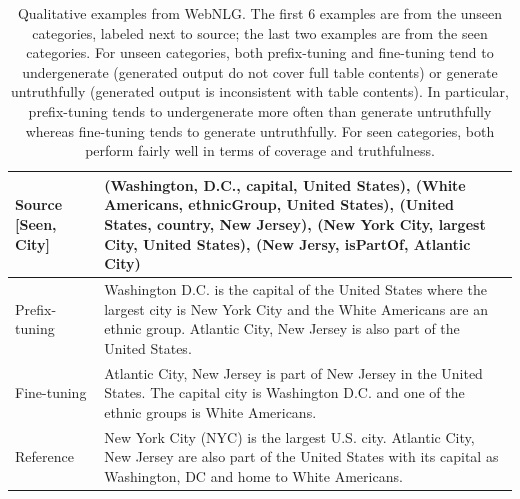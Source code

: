 \documentclass[11pt,a4paper]{article}
\begin{document}
\begin{table}[]
{\begin{tabular}{lp{17cm}}
        \toprule

        Source [Seen, City]  &  (Washington, D.C., capital, United States),  (White Americans, ethnicGroup, United States), (United States, country, New Jersey), (New York City, largest City, United States), (New Jersy, isPartOf, Atlantic City)\\
        \midrule

        Prefix-tuning &  Washington D.C. is the capital of the United States where the largest city is New York City and the White Americans are an ethnic group. Atlantic City, New Jersey is also part of the United States. \\
        Fine-tuning   &  Atlantic City, New Jersey is part of New Jersey in the United States. The capital city is Washington D.C. and one of the ethnic groups is White Americans.\\ 
        Reference   & New York City (NYC) is the largest U.S. city. Atlantic City, New Jersey are also part of the United States with its capital as Washington, DC and home to White Americans.\\ 





        \bottomrule
    \end{tabular}}
    \caption{\label{app:qualitative-webnlg}  Qualitative examples from WebNLG. The first 6 examples are from the unseen categories, labeled next to source; the last two examples are from the seen categories. 
    For unseen categories, both prefix-tuning and fine-tuning tend to undergenerate (generated output do not cover full table contents) or generate untruthfully  (generated output is inconsistent with table contents). 
    In particular, prefix-tuning tends to undergenerate more often than  generate untruthfully whereas fine-tuning tends to  generate untruthfully. 
    For seen categories, both perform fairly well in terms of coverage and truthfulness. }
\end{table}


\end{document}
